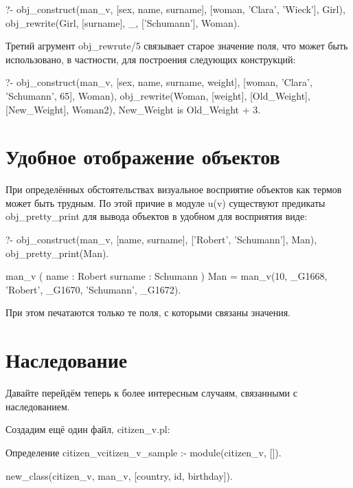 \documentclass[a4paper]{book}
\begin{document}
\begin{example}{}{}
?- obj_construct(man_v, [sex, name, surname], 
                        [woman, 'Clara', 'Wieck'], Girl), 
   obj_rewrite(Girl, [surname], _, ['Schumann'], Woman).
\end{example}

Третий агрумент obj_rewrute/5 связывает старое значение поля, что может быть
использовано, в частности, для построения следующих конструкций:

\begin{example}{}{}
?- obj_construct(man_v, [sex, name, surname, weight], 
                        [woman, 'Clara', 'Schumann', 65], Woman), 
   obj_rewrite(Woman, [weight], [Old_Weight], [New_Weight], Woman2),
   New_Weight is Old_Weight + 3.
\end{example}


\section{Удобное отображение объектов}

При определённых обстоятельствах визуальное восприятие объектов
как термов может быть трудным. По этой причие в модуле
u(v) существуют предикаты obj_pretty_print для вывода
объектов в удобном для восприятия виде:

\begin{example}{}{}
?- obj_construct(man_v, [name, surname], ['Robert', 'Schumann'], 
                 Man), 
   obj_pretty_print(Man).

man_v ( 
  name : Robert 
  surname : Schumann 
) 
Man = man_v(10, _G1668, 'Robert', _G1670, 'Schumann', _G1672).
\end{example}

При этом печатаются только те поля, с которыми связаны значения.

\section{Наследование}

Давайте перейдём теперь к более интересным случаям, связанными с
наследованием.

Создадим ещё один файл, citizen_v.pl:

\begin{example}{Определение citizen_v}{citizen_v_sample}
:- module(citizen_v, []).

new_class(citizen_v, man_v, [country, id, birthday]).
\end{example}
\end{document}
